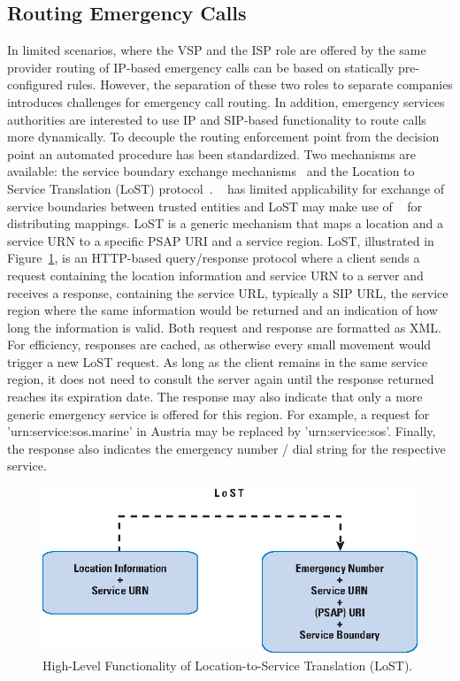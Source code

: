 \documentclass[12pt]{article}
\begin{document}
\subsection{Routing Emergency Calls}

In limited scenarios, where the VSP and the ISP role are offered by the same provider routing of IP-based emergency calls can be based on statically pre-configured rules. However, the separation of these two roles to separate companies introduces challenges for emergency call routing. In addition, emergency services authorities are interested to use IP and SIP-based functionality to route calls more dynamically. To decouple the routing enforcement point from the decision point an automated procedure has been standardized. Two mechanisms are available: the service boundary exchange mechanisms~\cite{rfc6739} and the Location to Service Translation (LoST) protocol~\cite{rfc5222}. ~\cite{rfc6739} has limited applicability for exchange of service boundaries between trusted entities and LoST may make use of ~\cite{rfc6739} for distributing mappings. LoST is a generic mechanism that maps a location and a service URN to a specific PSAP URI and a service region. LoST, illustrated in Figure~\ref{ietf-lost-figure}, is an HTTP-based query/response protocol where a client sends a request containing the location information and service URN to a server and receives a response, containing the service URL, typically a SIP URL, the service region where the same information would be returned and an indication of how long the information is valid. Both request and response are formatted as XML. For efficiency, responses are cached, as otherwise every small movement would trigger a new LoST request. As long as the client remains in the same service region, it does not need to consult the server again until the response returned reaches its expiration date. The response may also indicate that only a more generic emergency service is offered for this region. For example, a request for 'urn:service:sos.marine' in Austria may be replaced by 'urn:service:sos'. Finally, the response also indicates the emergency number / dial string for the respective service.

\begin{figure}[!t]
 \centering
 \includegraphics[scale=0.80]{figures/ietf-lost-figure.eps}
 \caption{High-Level Functionality of Location-to-Service Translation (LoST).}
 \label{ietf-lost-figure}
\end{figure}
\end{document}
